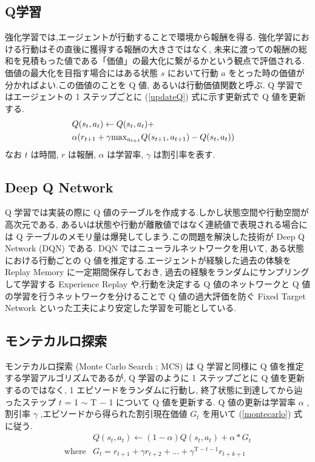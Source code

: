 \documentclass[twocolumn]{jarticle}
\begin{document}
\subsection{Q学習}
強化学習では,エージェントが行動することで環境から報酬を得る. 強化学習における行動はその直後に獲得する報酬の大きさではなく, 未来に渡っての報酬の総和を見積もった値である「価値」の最大化に繋がるかという観点で評価される.
価値の最大化を目指す場合にはある状態 $s$ において行動 $a$ をとった時の価値が分かればよい.この価値のことを Q 値, あるいは行動価値関数と呼ぶ.
 Q 学習ではエージェントの 1 ステップごとに (\ref{updateQ}) 式に示す更新式で Q 値を更新する.
\begin{eqnarray}
  \label{updateQ}
  \lefteqn{Q(s_t,a_t) \leftarrow Q(s_t,a_t) + } \nonumber \\
   &\alpha(r_{t+1} + \gamma \mathrm{max}_{a_{t+1}}Q(s_{t+1},a_{t+1}) - Q(s_t,a_t))& 
\end{eqnarray}
なお $t$ は時間, $r$ は報酬, $\alpha$ は学習率, $\gamma$ は割引率を表す.

\subsection{Deep Q Network}
Q 学習では実装の際に Q 値のテーブルを作成する.しかし状態空間や行動空間が高次元である, あるいは状態や行動が離散値ではなく連続値で表現される場合には Q テーブルのメモリ量は爆発してしまう.この問題を解決した技術が Deep Q Network (DQN) である.
 DQN ではニューラルネットワークを用いて, ある状態における行動ごとの Q 値を推定する.エージェントが経験した過去の体験を Replay Memory に一定期間保存しておき, 過去の経験をランダムにサンプリングして学習する Experience Replay や,行動を決定する Q 値のネットワークと Q 値の学習を行うネットワークを分けることで Q 値の過大評価を防ぐ Fixed Target Network といった工夫により安定した学習を可能としている\cite{DQN}.

\subsection{モンテカルロ探索}
モンテカルロ探索 (Monte Carlo Search ; MCS) は Q 学習と同様に Q 値を推定する学習アルゴリズムであるが, Q 学習のように 1 ステップごとに Q 値を更新するのではなく, 1 エピソードをランダムに行動し, 終了状態に到達してから辿ったステップ $t$ = 1 $\sim$ T $-$ 1 について Q 値を更新する. Q 値の更新は学習率 $\alpha$ , 割引率 $\gamma$ ,エピソードから得られた割引現在価値 $G_t$ を用いて (\ref{montecarlo}) 式に従う.
\begin{eqnarray}
  \label{montecarlo}
  &Q(s_t,a_t) \leftarrow (1 - \alpha)Q(s_t,a_t) + \alpha * G_{t} \\
  \mathrm{where}  &G_t = r_{t+1} + \gamma r_{t+2} + ... + \gamma^{\mathrm{T}-t-1} r_{t+k+1} \nonumber
\end{eqnarray}
\end{document}
